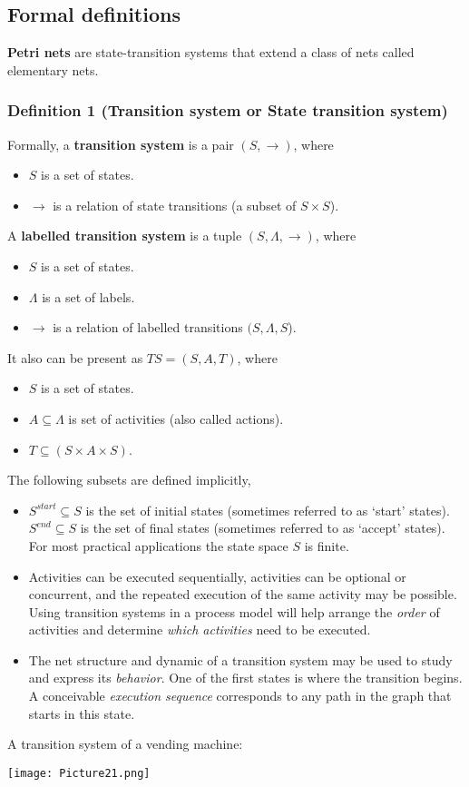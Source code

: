 \documentclass[a4paper]{article}
\begin{document}
\subsection{Formal definitions}
\textbf{Petri nets} are state-transition systems that extend a class of nets called elementary nets.
\subsubsection{Definition 1 (Transition system or State transition system)}
Formally, a \textbf{transition system} is a pair $(S, \rightarrow)$, where 
\begin{itemize}
    \item $S$ is a set of states.
    \item $\rightarrow$ is a relation of state transitions (a subset of $S \times S$).
\end{itemize}
A \textbf{labelled transition system} is a tuple $(S, \Lambda, \rightarrow)$, where 
\begin{itemize}
    \item $S$ is a set of states.
    \item $\Lambda$ is a set of labels.
    \item $\rightarrow$ is a relation of labelled transitions $(S, \Lambda, S$).
\end{itemize}
It also can be present as $TS = (S, A, T)$, where 
\begin{itemize}
    \item $S$ is a set of states.
    \item $A \subseteq \Lambda$ is set of activities (also called actions).
    \item $T \subseteq (S \times A \times S)$.
\end{itemize}
The following subsets are defined implicitly,
\begin{itemize}
    \item $S^{start} \subseteq S$ is the set of initial states (sometimes referred to as ‘start’ states).\newline
    $S^{end} \subseteq S$ is the set of final states (sometimes referred to as ‘accept’ states).\newline
    For most practical applications the state space $S$ is finite.
    \item Activities can be executed sequentially, activities can be optional or concurrent, and the repeated execution of the same activity may be possible. Using transition systems in a process model will help arrange the \textit{order} of activities and determine \textit{which activities} need to be executed.
    \item The net structure and dynamic of a transition system may be used to study and express its \textit{behavior}. One of the first states is where the transition begins. A conceivable \textit{execution sequence} corresponds to any path in the graph that starts in this state.
\end{itemize}
A transition system of a vending machine:
\begin{center}
    \texttt{[image: Picture21.png]}
\end{center}
\end{document}
